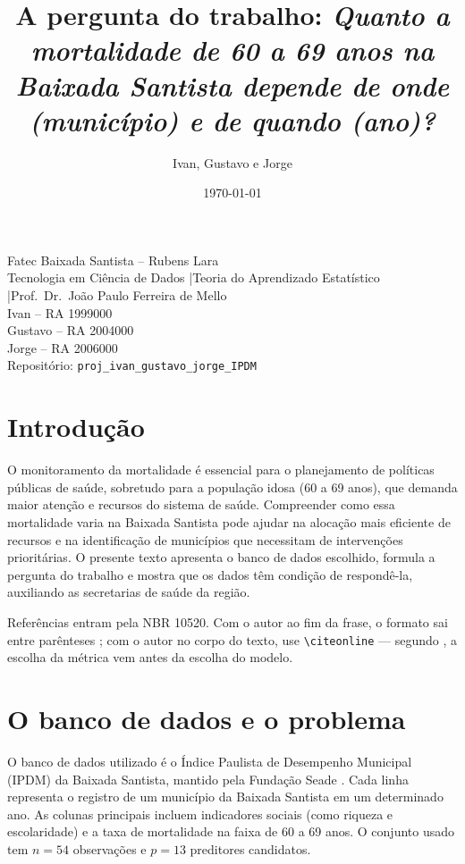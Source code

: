 \documentclass[12pt,a4paper,oneside]{article}\usepackage[]{graphicx}\usepackage[]{xcolor}
\title{A pergunta do trabalho: \textit{Quanto a mortalidade de 60 a 69 anos
na Baixada Santista depende de onde (município) e de quando (ano)?}}
\author{Ivan, Gustavo e Jorge}
\date{\today}
\providecommand{\citeonline}[1]{\citet{#1}}
\providecommand{\textual}{}
\newcommand{\nomecurso}{Tecnologia em Ciência de Dados}
\newcommand{\nomedisciplina}{Teoria do Aprendizado Estatístico}
\newcommand{\nomeprofessor}{Prof.\ Dr.\ João Paulo Ferreira de Mello}
\newcommand{\repositorio}{proj\_ivan\_gustavo\_jorge\_IPDM}
\newcommand{\integrantes}{%
  Ivan -- RA 1999000 \\
  Gustavo -- RA 2004000 \\
  Jorge -- RA 2006000%
}
\begin{document}
\frenchspacing

\maketitle

\begin{center}
  \small
  Fatec Baixada Santista -- Rubens Lara \\
  \nomecurso{} \quad|\quad \nomedisciplina{} \quad|\quad \nomeprofessor{} \\[0.4em]
  \integrantes \\[0.4em]
  Repositório: \texttt{\repositorio}
\end{center}

\textual

\section{Introdução}
O monitoramento da mortalidade é essencial para o planejamento de políticas públicas de saúde, sobretudo para a população idosa (60 a 69 anos), que demanda maior atenção e recursos do sistema de saúde. Compreender como essa mortalidade varia na Baixada Santista pode ajudar na alocação mais eficiente de recursos e na identificação de municípios que necessitam de intervenções prioritárias. O presente texto apresenta o banco de dados escolhido, formula a pergunta do trabalho e mostra que os dados têm condição de respondê-la, auxiliando as secretarias de saúde da região.

Referências entram pela NBR 10520. Com o autor ao fim da frase, o formato sai
entre parênteses \cite{james2021}; com o autor no corpo do texto, use
\verb|\citeonline| --- segundo \citeonline{bruce2019}, a escolha da métrica vem
antes da escolha do modelo.

\section{O banco de dados e o problema}
O banco de dados utilizado é o Índice Paulista de Desempenho Municipal (IPDM) da Baixada Santista, mantido pela Fundação Seade \cite{fonte_dados}. Cada linha representa o registro de um município da Baixada Santista em um determinado ano. As colunas principais incluem indicadores sociais (como riqueza e escolaridade) e a taxa de mortalidade na faixa de 60 a 69 anos. O conjunto usado tem $n = \text{54}$ observações e $p = \text{13}$ preditores candidatos.
\end{document}
